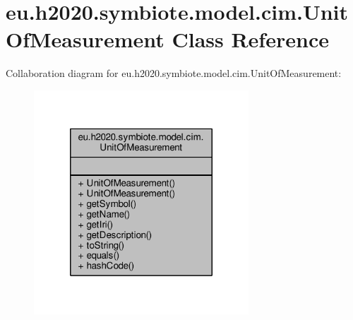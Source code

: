 \hypertarget{classeu_1_1h2020_1_1symbiote_1_1model_1_1cim_1_1UnitOfMeasurement}{}\section{eu.\+h2020.\+symbiote.\+model.\+cim.\+Unit\+Of\+Measurement Class Reference}
\label{classeu_1_1h2020_1_1symbiote_1_1model_1_1cim_1_1UnitOfMeasurement}


Collaboration diagram for eu.\+h2020.\+symbiote.\+model.\+cim.\+Unit\+Of\+Measurement\+:
\nopagebreak
\begin{figure}[H]
\begin{center}
\leavevmode
\includegraphics[width=228pt]{classeu_1_1h2020_1_1symbiote_1_1model_1_1cim_1_1UnitOfMeasurement__coll__graph}
\end{center}
\end{figure}

